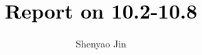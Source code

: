 \documentclass[journal]{IEEEtran}
\begin{document}
\title{\textcolor{black}{Report on 10.2-10.8}}      

\author{Shenyao Jin} 


\maketitle


\end{document}
